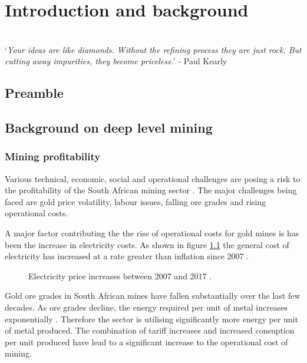 \chapter{Introduction and background}  %
\setcounter{page}{1}
\vspace{38em}

\hrulefill
\\
\enquote*{\textit{Your ideas are like diamonds. Without the refining process they are just rock. But cutting away impurities, they become priceless.}} - Paul Kearly\\
\newpage


\section{Preamble}

\section{Background on deep level mining}

\subsection{Mining profitability}
 Various technical, economic, social and operational challenges are posing a risk to the profitability of the South African mining sector \cite{neingo2016trends}. The major challenges being faced are gold price volatility, labour issues, falling ore grades and rising operational costs.\par
A major factor contributing the the rise of operational costs for gold mines is has been the increase in electricity costs. As shown in figure \ref{fig: Eskom tariffs} the general cost of electricity has increased at a rate greater than inflation since 2007 \cite{Eskom2013Tariffs}.
\begin{figure}[h]
	\centering
	\fbox{}
	\caption[Electricity price increases between 2007 and 2017.]{Electricity price increases between 2007 and 2017 \cite{Eskom2013Tariffs}.}
	\label{fig: Eskom tariffs}
\end{figure}
\par
Gold ore grades in South African mines have fallen substantially over the last few decades\cite{mudd2007global}. As ore grades decline, the energy required per unit of metal increases exponentially \cite{muller2010numerical}. Therefore the sector is utilising significantly more energy per unit of metal produced. The combination of tariff increases and increased consuption per unit produced have lead to a significant increase to the operational cost of mining. \par



